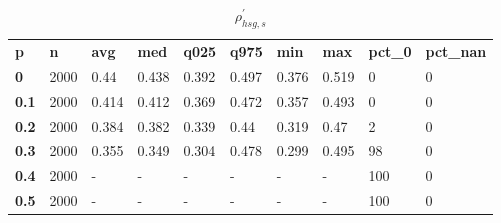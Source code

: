 \begin{table}[h]
 \centering 
\footnotesize
\caption{$\rho_{hsg,s}^\prime $}
\label{tab:alphahsgs}
\begin{tabular}[h]{| l l l l l l l l l l|
    } \hline
\textbf{ p} & \textbf{ n} & \textbf{ avg} & \textbf{ med} & \textbf{ q025} & \textbf{ q975} & \textbf{ min} & \textbf{ max} & \textbf{ pct\_0} & \textbf{ pct\_nan}
           \\
  \textbf{  0} & 2000 &  0.44 & 0.438 & 0.392 & 0.497 & 0.376 & 0.519 &   0 & 0
           \\
  \textbf{0.1} & 2000 & 0.414 & 0.412 & 0.369 & 0.472 & 0.357 & 0.493 &   0 & 0
           \\
  \textbf{0.2} & 2000 & 0.384 & 0.382 & 0.339 &  0.44 & 0.319 &  0.47 &   2 & 0
           \\
  \textbf{0.3} & 2000 & 0.355 & 0.349 & 0.304 & 0.478 & 0.299 & 0.495 &  98 & 0
           \\
  \textbf{0.4} & 2000 & - & - & - & - & - & - & 100 & 0
           \\
  \textbf{0.5} & 2000 & - & - & - & - & - & - & 100 & 0
           \\
 \hline \end{tabular}
 \end{table}
